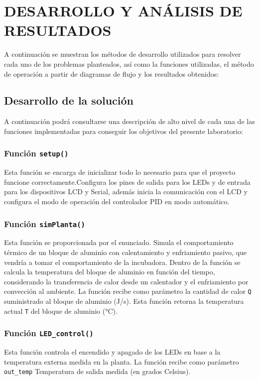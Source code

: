\newpage
\section{DESARROLLO Y ANÁLISIS DE RESULTADOS}

A continuación se muestran los métodos de desarrollo utilizados para resolver cada uno de los problemas planteados, así como la funciones utilizadas, el método de operación a partir de diagramas de flujo y los resultados obtenidos:

\subsection{Desarrollo de la solución}

A continuación podrá consultarse una descripción de alto nivel de cada una de las funciones implementadas para conseguir los objetivos del presente laboratorio: 

\subsubsection{Función \texttt{setup()}}
Esta función se encarga de inicializar todo lo necesario para que el proyecto funcione correctamente.Configura los pines de salida para los LEDs y de entrada para los dispositivos LCD y Serial, además inicia la comunicación con el LCD y configura el modo de operación del controlador PID en modo automático.

\subsubsection{Función \texttt{simPlanta()}}
Esta función se proporcionada por el enunciado. Simula el comportamiento térmico de un bloque de aluminio con calentamiento y enfriamiento pasivo, que vendría a tomar el comportamiento de la incubadora. Dentro de la función se calcula la temperatura del bloque de aluminio en función del tiempo, considerando la transferencia de calor desde un calentador y el enfriamiento por convección al ambiente. La función recibe como parámetro la cantidad de calor \texttt{Q} suministrado al bloque de aluminio (J/s). Esta función retorna la temperatura actual \texttt{T} del bloque de aluminio (°C).

\subsubsection{Función \texttt{LED\_control()}}
Esta función controla el encendido y apagado de los LEDs en base a la temperatura externa medida en la planta. La función recibe como parámetro \texttt{out\_temp} Temperatura de salida medida (en grados Celsius).
